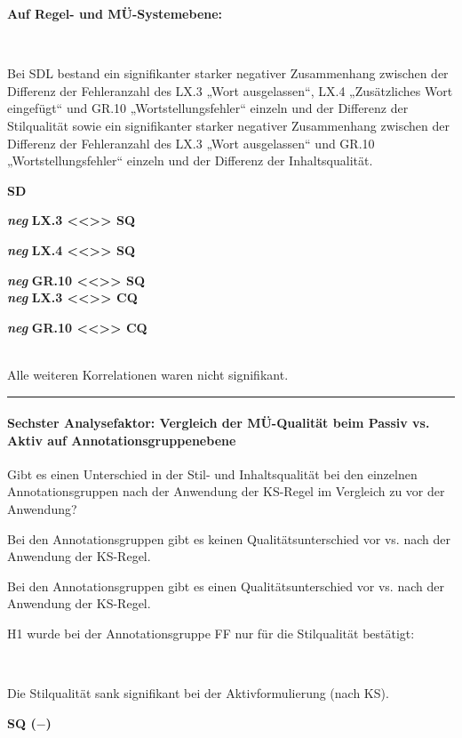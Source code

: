\noindent
\parbox[t]{.7\textwidth}{\textbf{Auf Regel- und MÜ-Systemebene:}}\\
\parbox[t]{.7\textwidth}{
Bei SDL bestand ein signifikanter starker negativer Zusammenhang zwischen der Differenz der Fehleranzahl des LX.3 „Wort ausgelassen“, LX.4 „Zusätzliches Wort eingefügt“ und GR.10 „Wortstellungsfehler“ einzeln und der Differenz der Stilqualität sowie ein signifikanter starker negativer Zusammenhang zwischen der Differenz der Fehleranzahl des LX.3 „Wort ausgelassen“ und GR.10 „Wortstellungsfehler“ einzeln und der Differenz der Inhaltsqualität.
}
\parbox[t]{.04\textwidth}{}
\colorbox{smGreen}{\parbox[t]{.25\textwidth}{
{ \textbf{SD}}

{ \textbf{\textit{neg}} \textbf{LX.3 <{}<{}>{}> SQ}}

{ \textbf{\textit{neg}} \textbf{LX.4 <{}<{}>{}> SQ}}

{ \textbf{\textit{neg}} \textbf{GR.10 <{}<{}>{}> SQ}}\\

{ \textbf{\textit{neg}} \textbf{LX.3 <{}<{}>{}> CQ}}

 \textbf{\textit{neg}} \textbf{GR.10 <{}<{}>{}> CQ}\\
 \\
}}

\medskip
\noindent
\parbox[t]{.7\textwidth}{Alle weiteren Korrelationen waren nicht signifikant.}

\hrule
\paragraph*{Sechster Analysefaktor: Vergleich der MÜ-Qualität beim Passiv vs. Aktiv auf Annotationsgruppenebene}
\begin{description}[font=\normalfont\bfseries]
\item [Fragestellung:] Gibt es einen Unterschied in der Stil- und Inhaltsqualität bei den einzelnen Annotationsgruppen nach der Anwendung der KS-Regel im Vergleich zu vor der Anwendung?
\item [H0 --] Bei den Annotationsgruppen gibt es keinen Qualitätsunterschied vor vs. nach der Anwendung der KS-Regel.
\item [H1 --] Bei den Annotationsgruppen gibt es einen Qualitätsunterschied vor vs. nach der Anwendung der KS-Regel.
\item [Resultat]
\end{description}
\noindent
\parbox[t]{.8\textwidth}{
H1 wurde bei der Annotationsgruppe FF nur für die Stilqualität bestätigt:
}\\
\parbox[t]{.8\textwidth}{
Die Stilqualität sank signifikant bei der Aktivformulierung (nach KS).
}
\parbox[t]{.04\textwidth}{}
\colorbox{smGreen}{\parbox[t]{.15\textwidth}{
\textbf{SQ ($-$)}\\
}}

